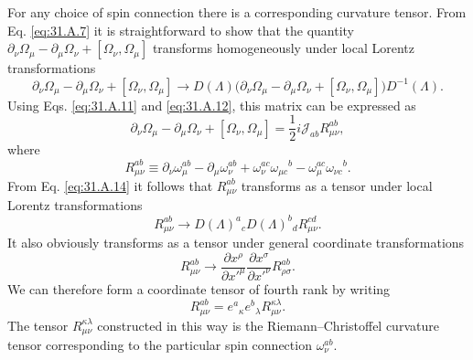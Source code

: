 For any choice of spin connection there is a corresponding curvature
tensor. From Eq. \eqref{eq:31.A.7} it is straightforward to show that the
quantity
\(\partial_\nu\Omega_\mu-\partial_\mu\Omega_\nu+
[\Omega_\nu,\Omega_\mu]\) transforms homogeneously under local Lorentz
transformations
\begin{equation}
  \partial_\nu\Omega_\mu-\partial_\mu\Omega_\nu
  +[\Omega_\nu,\Omega_\mu]
  \longrightarrow
  D(\Lambda)
  \bigl(
    \partial_\nu\Omega_\mu-\partial_\mu\Omega_\nu
    +[\Omega_\nu,\Omega_\mu]
  \bigr)D^{-1}(\Lambda).
  \tag{31.A.14}\label{eq:31.A.14}
\end{equation}
Using Eqs. \eqref{eq:31.A.11} and \eqref{eq:31.A.12}, this matrix can be
expressed as
\begin{equation}
  \partial_\nu\Omega_\mu-\partial_\mu\Omega_\nu
  +[\Omega_\nu,\Omega_\mu]
  =\frac{1}{2}i\mathscr{J}_{ab}R_{\mu\nu}^{ab},
  \tag{31.A.15}\label{eq:31.A.15}
\end{equation}
where
\begin{equation}
  R_{\mu\nu}^{ab}
  \equiv
  \partial_\nu\omega_\mu^{ab}-\partial_\mu\omega_\nu^{ab}
  +\omega_\nu^{ac}\omega_{\mu c}{}^b
  -\omega_\mu^{ac}\omega_{\nu c}{}^b.
  \tag{31.A.16}\label{eq:31.A.16}
\end{equation}
From Eq. \eqref{eq:31.A.14} it follows that \(R_{\mu\nu}^{ab}\)
transforms as a tensor under local Lorentz transformations
\begin{equation}
  R_{\mu\nu}^{ab}
  \longrightarrow
  D(\Lambda)^a{}_cD(\Lambda)^b{}_dR_{\mu\nu}^{cd}.
  \tag{31.A.17}\label{eq:31.A.17}
\end{equation}
It also obviously transforms as a tensor under general coordinate
transformations
\begin{equation}
  R_{\mu\nu}^{ab}
  \longrightarrow
  \frac{\partial x^\rho}{\partial x'^\mu}
  \frac{\partial x^\sigma}{\partial x'^\nu}
  R_{\rho\sigma}^{ab}.
  \tag{31.A.18}\label{eq:31.A.18}
\end{equation}
We can therefore form a coordinate tensor of fourth rank by writing
\begin{equation}
  R_{\mu\nu}^{ab}
  =e^a{}_\kappa e^b{}_\lambda R_{\mu\nu}^{\kappa\lambda}.
  \tag{31.A.19}\label{eq:31.A.19}
\end{equation}
The tensor \(R_{\mu\nu}^{\kappa\lambda}\) constructed in this way is the
Riemann--Christoffel curvature tensor corresponding to the particular
spin connection \(\omega_\nu^{ab}\).
